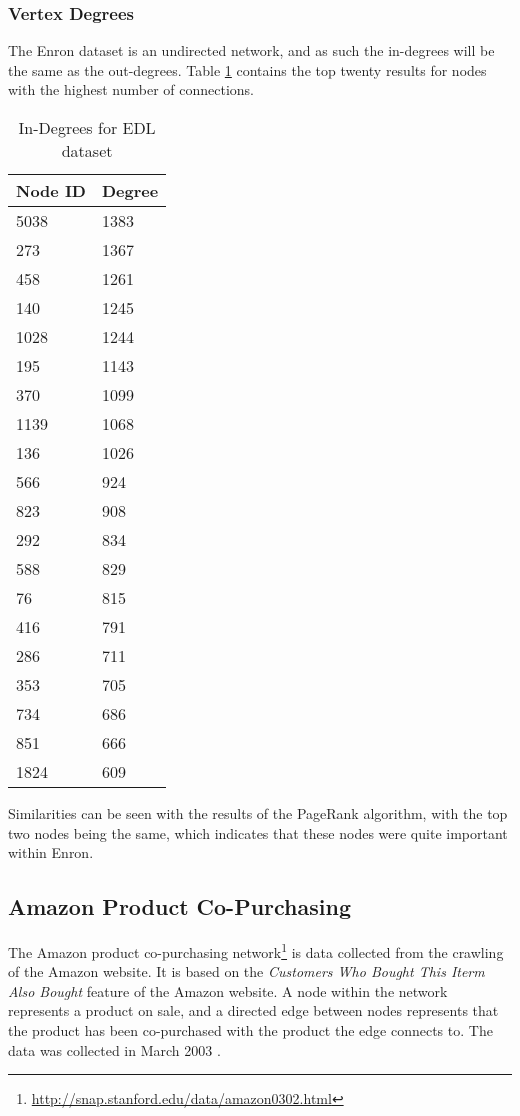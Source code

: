 \subsubsection{Vertex Degrees}
The Enron dataset is an undirected network, and as such the in-degrees will be the same as the out-degrees. Table \ref{tab:enrondegree} contains the top twenty results for nodes with the highest number of connections.

\begin{table}[htbp]%
\centering
\begin{tabular}{|l|l|}
\hline
Node ID & Degree \\
\hline
5038 & 1383 \\
273 & 1367 \\
458 & 1261 \\
140 & 1245 \\
1028 & 1244 \\
195 & 1143 \\
370 & 1099 \\
1139 & 1068 \\
136 & 1026 \\
566 & 924 \\
823 & 908 \\
292 & 834 \\
588 & 829 \\
76 & 815 \\
416 & 791 \\
286 & 711 \\
353 & 705 \\
734 & 686 \\
851 & 666 \\
1824 & 609 \\
\hline
\end{tabular}
\caption{In-Degrees for EDL dataset}
\label{tab:enrondegree}
\end{table}

Similarities can be seen with the results of the PageRank algorithm, with the top two nodes being the same, which indicates that these nodes were quite important within Enron.

\subsection{Amazon Product Co-Purchasing}
The Amazon product co-purchasing network\footnote{\url{http://snap.stanford.edu/data/amazon0302.html}} is data collected from the crawling of the Amazon website. It is based on the \emph{Customers Who Bought This Iterm Also Bought} feature of the Amazon website. A node within the network represents a product on sale, and a directed edge between nodes represents that the product has been co-purchased with the product the edge connects to. The data was collected in March 2003 \cite{snap}.

